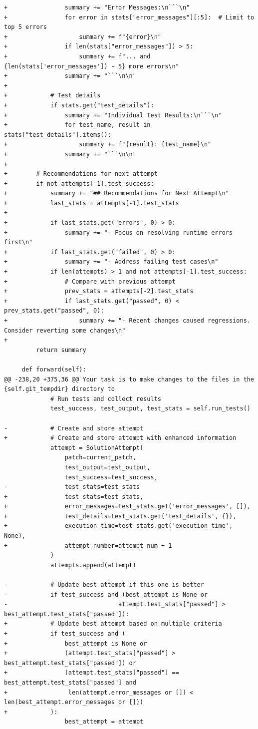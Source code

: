 \documentclass{article}
\begin{document}
\begin{lstlisting}[style=diffstyle]
+                summary += "Error Messages:\n```\n"
+                for error in stats["error_messages"][:5]:  # Limit to top 5 errors
+                    summary += f"{error}\n"
+                if len(stats["error_messages"]) > 5:
+                    summary += f"... and {len(stats['error_messages']) - 5} more errors\n"
+                summary += "```\n\n"
+            
+            # Test details
+            if stats.get("test_details"):
+                summary += "Individual Test Results:\n```\n"
+                for test_name, result in stats["test_details"].items():
+                    summary += f"{result}: {test_name}\n"
+                summary += "```\n\n"
+
+        # Recommendations for next attempt
+        if not attempts[-1].test_success:
+            summary += "## Recommendations for Next Attempt\n"
+            last_stats = attempts[-1].test_stats
+            
+            if last_stats.get("errors", 0) > 0:
+                summary += "- Focus on resolving runtime errors first\n"
+            if last_stats.get("failed", 0) > 0:
+                summary += "- Address failing test cases\n"
+            if len(attempts) > 1 and not attempts[-1].test_success:
+                # Compare with previous attempt
+                prev_stats = attempts[-2].test_stats
+                if last_stats.get("passed", 0) < prev_stats.get("passed", 0):
+                    summary += "- Recent changes caused regressions. Consider reverting some changes\n"
+            
         return summary
 
     def forward(self):
@@ -238,20 +375,36 @@ Your task is to make changes to the files in the {self.git_tempdir} directory to
             # Run tests and collect results 
             test_success, test_output, test_stats = self.run_tests()
             
-            # Create and store attempt
+            # Create and store attempt with enhanced information
             attempt = SolutionAttempt(
                 patch=current_patch,
                 test_output=test_output,
                 test_success=test_success,
-                test_stats=test_stats
+                test_stats=test_stats,
+                error_messages=test_stats.get('error_messages', []),
+                test_details=test_stats.get('test_details', {}),
+                execution_time=test_stats.get('execution_time', None),
+                attempt_number=attempt_num + 1
             )
             attempts.append(attempt)
             
-            # Update best attempt if this one is better
-            if test_success and (best_attempt is None or 
-                               attempt.test_stats["passed"] > best_attempt.test_stats["passed"]):
+            # Update best attempt based on multiple criteria
+            if test_success and (
+                best_attempt is None or
+                (attempt.test_stats["passed"] > best_attempt.test_stats["passed"]) or
+                (attempt.test_stats["passed"] == best_attempt.test_stats["passed"] and
+                 len(attempt.error_messages or []) < len(best_attempt.error_messages or []))
+            ):
                 best_attempt = attempt
             

\end{lstlisting}
\end{document}
